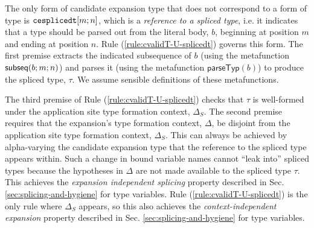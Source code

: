 The only form of candidate expansion type that does not correspond to a form of type is $\texttt{cesplicedt}[m; n]$, which is a \emph{reference to a spliced type}, i.e. it indicates that a type should be parsed out from the literal body, $b$, beginning at position $m$ and ending at position $n$. Rule (\ref{rule:cvalidT-U-splicedt}) governs this form. The first premise extracts the indicated subsequence of $b$ (using the metafunction $\mathsf{subseq}(b; m; n)$) and parses it (using the metafunction $\mathsf{parseTyp}(b)$) to produce the spliced type, $\tau$. We assume sensible definitions of these metafunctions.

 The third premise of Rule (\ref{rule:cvalidT-U-splicedt}) checks that $\tau$ is well-formed under the application site type formation context, $\Delta_S$. The second premise requires that the expansion's type formation context, $\Delta$, be disjoint from the application site type formation context, $\Delta_S$. This can always be achieved by alpha-varying the candidate expansion type that the reference to the spliced type appears within. Such a change in bound variable names cannot ``leak into'' spliced types because the hypotheses in $\Delta$ are not made available to the spliced type $\tau$. This achieves the \emph{expansion independent splicing} property described in Sec. \ref{sec:splicing-and-hygiene} for type variables. Rule (\ref{rule:cvalidT-U-splicedt}) is the only rule where $\Delta_S$ appears, so this also achieves the \emph{context-independent expansion} property described in Sec. \ref{sec:splicing-and-hygiene} for type variables.

